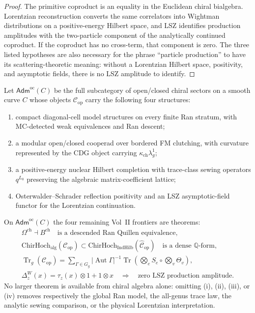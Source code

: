 \documentclass[11pt]{article}
\newcommand{\cC}{\mathcal{C}}
\newcommand{\Tr}{\operatorname{Tr}}
\newcommand{\ChirHoch}{\mathrm{ChirHoch}}
\begin{document}
\begin{proof}
The primitive coproduct is an equality in the Euclidean chiral
bialgebra.  Lorentzian reconstruction converts the same
correlators into Wightman distributions on a positive-energy
Hilbert space, and LSZ identifies production amplitudes with the
two-particle component of the analytically continued coproduct.
If the coproduct has no cross-term, that component is zero.  The
three listed hypotheses are also necessary for the phrase
``particle production'' to have its scattering-theoretic meaning:
without a Lorentzian Hilbert space, positivity, and asymptotic
fields, there is no LSZ amplitude to identify.
\end{proof}

\begin{theorem}
\label{thm:admissible-global-analytic-model}
Let $\mathsf{Adm}^{\mathrm{oc}}(C)$ be the full subcategory of
open/closed chiral sectors on a smooth curve $C$ whose objects
$\cC_{\mathrm{op}}$ carry the following four structures:
\begin{enumerate}[label=\textup{(\roman*)},nosep]
\item compact diagonal-cell model structures on every finite Ran
stratum, with MC-detected weak equivalences and Ran descent;
\item a modular open/closed cooperad over bordered FM clutching,
with curvature represented by the CDG object carrying
$\kappa_{\mathrm{ch}}\lambda_g^1$;
\item a positive-energy nuclear Hilbert completion with trace-class
sewing operators $q^{L_0}$ preserving the algebraic matrix-coefficient
lattice;
\item Osterwalder--Schrader reflection positivity and an LSZ
asymptotic-field functor for the Lorentzian continuation.
\end{enumerate}
On $\mathsf{Adm}^{\mathrm{oc}}(C)$ the four remaining Vol~II
frontiers are theorems:
\[
\begin{gathered}
\Omega^{\mathrm{ch}}\dashv B^{\mathrm{ch}}
\quad\text{is a descended Ran Quillen equivalence},\\
\ChirHoch_{\mathrm{alg}}(\cC_{\mathrm{op}})
\subset
\ChirHoch_{\mathrm{IndHilb}}(\widehat{\cC}_{\mathrm{op}})
\quad\text{is a dense }\mathbb Q\text{-form},\\
\Tr_g(\cC_{\mathrm{op}})
=
\sum_{\Gamma\in G_g}
|\operatorname{Aut}\Gamma|^{-1}
\Tr\!\left(
  \bigotimes_{e}S_e\circ\bigotimes_v\Theta_v
\right),\\
\Delta_z^W(x)=\tau_z(x)\otimes1+1\otimes x
\quad\Longrightarrow\quad
\text{zero LSZ production amplitude.}
\end{gathered}
\]
No larger theorem is available from chiral algebra alone: omitting
\textup{(i)}, \textup{(ii)}, \textup{(iii)}, or \textup{(iv)}
removes respectively the global Ran model, the all-genus trace
law, the analytic sewing comparison, or the physical Lorentzian
interpretation.
\end{theorem}
\end{document}
